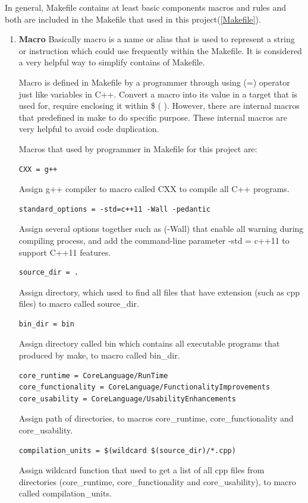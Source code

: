 \documentclass[11pt]{report}
\begin{document}
In general, Makefile contains at least basic components macros and rules and both are included in the Makefile that used in this project(\ref{Makefile}).

\begin{enumerate}
\item \textbf{Macro} Basically macro is a name or alias that is used to represent a string or instruction which could use frequently within the Makefile.  It is considered a very helpful way to simplify contains of Makefile.

Macro is defined in Makefile by a programmer through using (=) operator just like variables in C++. Convert a macro into its value in a target that is used for, require enclosing it within \$ ( ). However, there are internal macros that predefined in make to do specific purpose. These internal macros are very helpful to avoid code duplication.

Macros that used by programmer in Makefile for this project are:
\begin{verbatim}
CXX = g++ 
\end{verbatim}
Assign g++ compiler to macro called CXX to compile all C++ programs.

\begin{verbatim}
standard_options = -std=c++11 -Wall -pedantic
\end{verbatim}
Assign several options together such as (-Wall) that enable all warning during compiling process, and add the command-line parameter -std = c++11 to support C++11 features.

\begin{verbatim}
source_dir = .
\end{verbatim}
Assign directory, which used to find all files that have extension (such as cpp files)  to macro called source\_dir.

\begin{verbatim}
bin_dir = bin
\end{verbatim}
Assign directory called bin which contains all executable programs that produced by make, to macro called bin\_dir.

\begin{verbatim}
core_runtime = CoreLanguage/RunTime
core_functionality = CoreLanguage/FunctionalityImprovements
core_usability = CoreLanguage/UsabilityEnhancements
\end{verbatim}
Assign path of directories, to macros core\_runtime, core\_functionality and core\_usability.

\begin{verbatim}
compilation_units = $(wildcard $(source_dir)/*.cpp)
\end{verbatim}
Assign wildcard function that used to get a list of all cpp files from directories (core\_runtime, core\_functionality and core\_usability), to macro called compilation\_units.


\end{enumerate}
\end{document}
